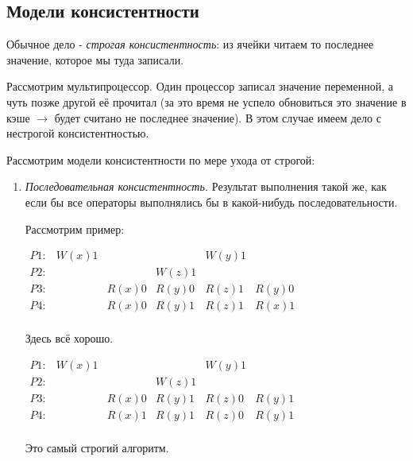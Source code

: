 \documentclass[a4paper,12pt]{article}
\begin{document}
	\subsection {\bf Модели консистентности}
	Обычное дело - {\em строгая консистентность}: из ячейки читаем то последнее значение, которое мы
туда записали.

	Рассмотрим мультипроцессор. Один процессор записал значение переменной, а чуть позже другой
её прочитал (за это время не успело обновиться это значение в кэше $\rightarrow$ будет считано
не последнее значение). В этом случае имеем дело с нестрогой консистентностью.

	Рассмотрим модели консистентности по мере ухода от строгой:
	\begin{enumerate}
		\item {\em Последовательная консистентность.} Результат выполнения такой же, как если бы
		все операторы выполнялись бы в какой-нибудь последовательности.
		
		Рассмотрим пример:
		
		$\begin{array}{cccccc}
		P1: & W(x)1 & & & W(y)1 \\
		P2: & & & W(z)1 \\
		P3: & & R(x)0 & R(y)0 & R(z)1 & R(y)0 \\
		P4: & & R(x)0 & R(y)1 & R(z)1 & R(x)1 \\
		\end{array}$
		
		Здесь всё хорошо.
		
		$\begin{array}{cccccc}
		P1: & W(x)1 & & & W(y)1 \\
		P2: & & & W(z)1 \\
		P3: & & R(x)0 & R(y)1 & R(z)0 & R(y)1 \\
		P4: & & R(x)1 & R(y)1 & R(z)0 & R(y)1 \\
		\end{array}$
		
		Это самый строгий алгоритм.
		

\end{enumerate}
\end{document}
